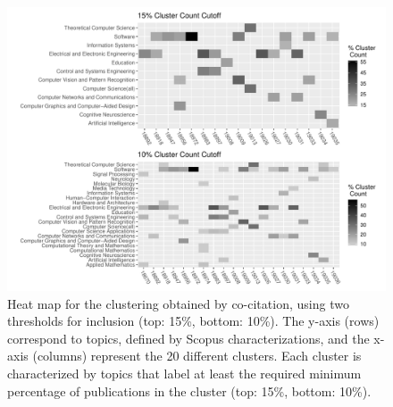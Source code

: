 \begin{figure}[ht]
\centering
  \includegraphics[scale=0.5]{scopus_dblp_heatmap3.pdf}
\caption{Heat map for the clustering obtained by co-citation, using two thresholds for inclusion (top: 15\%, bottom: 10\%). The  y-axis (rows) correspond to topics, defined by Scopus characterizations, and the
x-axis (columns) represent the 20 different clusters.  
Each cluster is characterized by topics that label at least the required minimum percentage of publications in the cluster (top: 15\%, bottom: 10\%).   }
\label{fig:heatmap_cocit}       %
\end{figure}
\newpage

